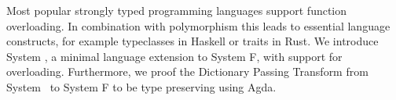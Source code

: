 Most popular strongly typed programming languages support function overloading. 
In combination with polymorphism this leads to essential language constructs, for example typeclasses in Haskell or traits in Rust.  
We introduce System \Fo, a minimal language extension to System F, with support for overloading.
Furthermore, we proof the Dictionary Passing Transform from System \Fo\ to System F to be type preserving using Agda.